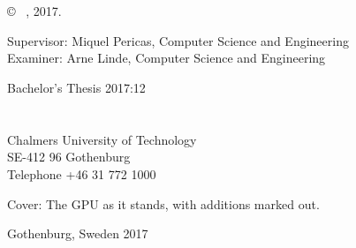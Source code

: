 \newpage
\thispagestyle{plain}
\vspace*{4.5cm}
\varHeadline \\
\varSubtitle \\
\varNames \setlength{\parskip}{1cm}

\copyright ~ \varNames, 2017. \setlength{\parskip}{1cm}

Supervisor: Miquel Pericas, Computer Science and Engineering\\
Examiner: Arne Linde, Computer Science and Engineering \setlength{\parskip}{1cm}

Bachelor's Thesis 2017:12\\	%
\varDepartment \\
\varResearchGroupName\\
Chalmers University of Technology\\
SE-412 96 Gothenburg\\
Telephone +46 31 772 1000 \setlength{\parskip}{0.5cm}

\vfill
Cover: The GPU as it stands, with additions marked out. \setlength{\parskip}{0.5cm}

Gothenburg, Sweden 2017

\setlength{\parindent}{1cm}                         
